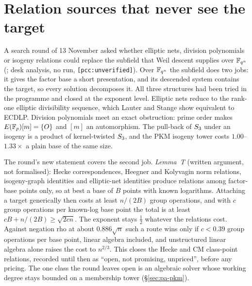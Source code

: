 \section{Relation sources that never see the target}\label{sec:gf-target}

A search round of 13 November asked whether elliptic nets, division
polynomials or isogeny relations could replace the subfield that Weil descent
supplies over $\mathbb{F}_{q^n}$
(; desk analysis,
no run, \texttt{[pcc:unverified]}). Over $\mathbb{F}_{q^n}$ the subfield does two
jobs: it gives the factor base a short presentation, and its descended
system contains the target, so every solution decomposes it. All three
structures had been tried in the programme and closed at the exponent
level. Elliptic nets reduce to the rank-one elliptic divisibility sequence,
which Lauter and Stange show equivalent to ECDLP. Division polynomials meet
an exact obstruction: prime order makes $E(\mathbb{F}_p)[m]=\{O\}$ and $[m]$ an
automorphism. The pull-back of $S_{3}$ under an isogeny is a product of
kernel-twisted $S_{3}$, and the PKM isogeny tower costs $1.00$--$1.33\times$ a
plain base of the same size.

The round's new statement covers the second job. \emph{Lemma~T} (written
argument, not formalised): Hecke correspondences, Heegner and Kolyvagin norm
relations, isogeny-graph identities and elliptic-net identities produce
relations among factor-base points only, so at best a base of $B$ points with
known logarithms. Attaching a target generically then costs at least
$n/(2B)$ group operations, and with $c$ group operations per known-log base
point the total is at least $cB+n/(2B)\ge\sqrt{2cn}$. The exponent stays
$\tfrac12$ whatever the relations cost. Against negation rho at about
$0.886\sqrt n$ such a route wins only if $c<0.39$ group operations per base
point, linear algebra included, and unstructured linear algebra alone raises
the cost to $n^{2/3}$. This closes the Hecke and CM class-point relations,
recorded until then as ``open, not promising, unpriced'', before any
pricing. The one class the round leaves open is an algebraic solver whose
working degree stays bounded on a membership tower
(\S\ref{sec:pa-pkm}).

